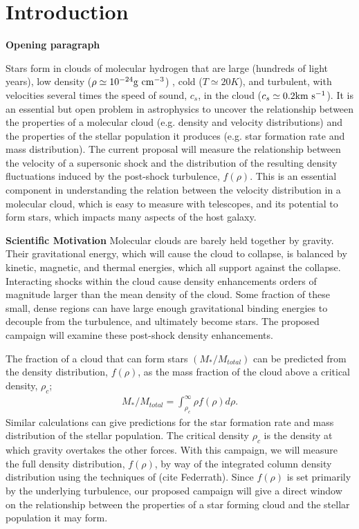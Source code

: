 \section{Introduction}

\noindent \textbf{Opening paragraph}

Stars form in clouds of molecular hydrogen that are large (hundreds of light
years), low density ($\rho \simeq 10^{-24}\rm{g}\ \rm{cm}^{-3}$) ,
cold ($T \simeq 20 K$), and turbulent, with velocities several times the speed
of sound, $c_s$, in the
cloud ($c_s\simeq 0.2 \rm{km}\ \rm{s^{-1}}$).  It is an essential but open problem in astrophysics to uncover the relationship between
the 
properties of a molecular cloud (e.g. density and velocity distributions)
and the properties of the stellar population it produces (e.g.  star formation
rate and mass distribution).  The current proposal
will measure the relationship between the velocity of a supersonic shock and the
distribution of the resulting density fluctuations induced by the post-shock
turbulence, $f(\rho)$.  This is an essential component
in understanding the relation between the velocity distribution in a molecular
cloud, which is easy to measure with telescopes, and its potential to form stars, which impacts
many aspects of the host galaxy.\citep{Padoan02}

\noindent \textbf{Scientific Motivation} 
Molecular clouds are barely held together by gravity. Their gravitational
energy, which will cause the cloud to collapse, is balanced
by kinetic, magnetic, and thermal energies, which all support against the
collapse.  
Interacting shocks within the cloud cause density enhancements orders of
magnitude larger than the mean density of the cloud.  Some fraction
of these small, dense regions can have large enough gravitational binding
energies
to decouple from the turbulence,  and ultimately become stars.  The proposed
campaign will examine these post-shock density enhancements.

The fraction
of a cloud that can form stars $(M_*/M_{total})$ can be predicted from the density distribution,
$f(\rho)$,  as
the mass fraction of the cloud 
above a critical density, $\rho_c$;
\begin{align}
M_*/M_{total} = \int_{\rho_c}^\infty \rho f(\rho) d\rho. \label{eqn_mass}
\end{align}
Similar
calculations can give predictions for the star formation rate and mass
distribution of the stellar population. The critical density $\rho_c$ is the density at which gravity
overtakes the other forces.  
With this campaign, we will measure the full density distribution, $f(\rho)$, by
way of the integrated column density distribution using the techniques of (cite
Federrath). Since $f(\rho)$ is set primarily by the underlying turbulence, our
proposed campaign will give a direct window on the relationship between the
properties of a star forming cloud and the stellar population it may form.

